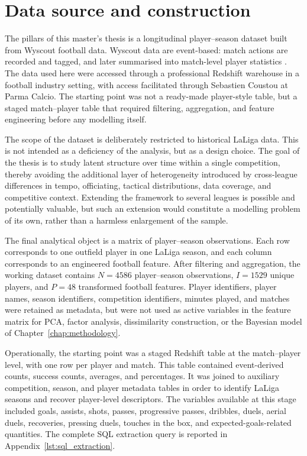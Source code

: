 \chapter{Data source and construction}
\label{chap:data_source}

The pillars of this master's thesis is a longitudinal player--season dataset built from Wyscout football data. Wyscout data are event-based: match actions are recorded and tagged, and later summarised into match-level player statistics \cite{wyscout_glossary}. The data used here were accessed through a professional Redshift warehouse in a football industry setting, with access facilitated through Sebastien Coustou at Parma Calcio. The starting point was not a ready-made player-style table, but a staged match--player table that required filtering, aggregation, and feature engineering before any modelling itself.

The scope of the dataset is deliberately restricted to historical LaLiga data. This is not intended as a deficiency of the analysis, but as a design choice. The goal of the thesis is to study latent structure over time within a single competition, thereby avoiding the additional layer of heterogeneity introduced by cross-league differences in tempo, officiating, tactical distributions, data coverage, and competitive context. Extending the framework to several leagues is possible and potentially valuable, but such an extension would constitute a modelling problem of its own, rather than a harmless enlargement of the sample.

The final analytical object is a matrix of player--season observations. Each row corresponds to one outfield player in one LaLiga season, and each column corresponds to an engineered football feature. After filtering and aggregation, the working dataset contains \(N=4586\) player--season observations, \(I = 1529\) unique players, and \(P = 48\) transformed football features. Player identifiers, player names, season identifiers, competition identifiers, minutes played, and matches were retained as metadata, but were not used as active variables in the feature matrix for PCA, factor analysis, dissimilarity construction, or the Bayesian model of Chapter~\ref{chap:methodology}.

Operationally, the starting point was a staged Redshift table at the match--player level, with one row per player and match. This table contained event-derived counts, success counts, averages, and percentages. It was joined to auxiliary competition, season, and player metadata tables in order to identify LaLiga seasons and recover player-level descriptors. The variables available at this stage included goals, assists, shots, passes, progressive passes, dribbles, duels, aerial duels, recoveries, pressing duels, touches in the box, and expected-goals-related quantities. The complete SQL extraction query is reported in Appendix~\ref{lst:sql_extraction}.

